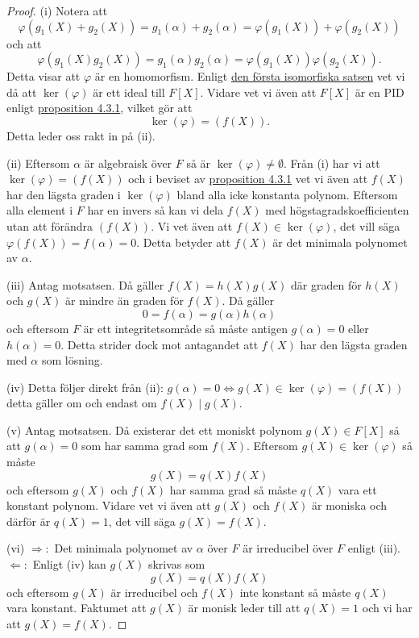 \documentclass{article}
\theoremstyle{definition}
\begin{document}
\begin{proof}
  (i) Notera att 
  \[\varphi(g_1(X) + g_2(X)) = g_1(\alpha) + g_2(\alpha) = \varphi(g_1(X)) + \varphi(g_2(X))\]
  och att 
  \[\varphi(g_1(X) g_2(X)) = g_1(\alpha) g_2(\alpha) = \varphi(g_1(X)) \varphi(g_2(X)).\]
  Detta visar att $\varphi$ är en homomorfism. Enligt \hyperlink{isomorfiska}{den första isomorfiska satsen} vet vi då att $\ker(\varphi)$ är ett ideal 
  till $F[X]$. Vidare vet vi även att $F[X]$ är en PID enligt \hyperlink{pid}{proposition 4.3.1}, vilket gör att 
  \[\ker(\varphi) = (f(X)).\]
  Detta leder oss rakt in på (ii).

  (ii) Eftersom $\alpha$ är algebraisk över $F$ så är $\ker(\varphi) \neq \emptyset$. Från (i) har vi att $\ker(\varphi) = (f(X))$
  och i beviset av \hyperlink{pid}{proposition 4.3.1} vet vi även att $f(X)$ har den lägsta graden i $\ker(\varphi)$ bland alla icke konstanta polynom. 
  Eftersom alla element i $F$ har en invers så kan vi dela $f(X)$ med högstagradskoefficienten utan att förändra $(f(X))$. Vi vet även att 
  $f(X) \in \ker(\varphi)$, det vill säga $\varphi(f(X)) = f(\alpha) = 0$. Detta betyder att $f(X)$ är det minimala polynomet av $\alpha$.

  (iii) Antag motsatsen. Då gäller $f(X) = h(X)g(X)$ där graden för $h(X)$ och $g(X)$ är mindre än graden för $f(X)$. Då gäller 
  \[0 = f(\alpha) = g(\alpha) h(\alpha)\]
  och eftersom $F$ är ett integritetsområde så måste antigen 
  $g(\alpha) = 0$ eller $h(\alpha) = 0$. Detta strider dock mot antagandet att $f(X)$ har den lägsta graden med $\alpha$ som lösning. 

  (iv) Detta följer direkt från (ii): $g(\alpha) = 0 \iff g(X) \in \ker(\varphi) = (f(X))$ detta gäller om och endast om $f(X) \; | \; g(X).$ 
  
  (v) Antag motsatsen. Då existerar det ett moniskt polynom $g(X) \in F[X]$ så att $g(\alpha) = 0$ som har samma grad som $f(X)$. 
  Eftersom $g(X) \in \ker(\varphi)$ så måste 
  \[g(X) = q(X) f(X)\]
  och eftersom $g(X)$ och $f(X)$ har samma grad så måste $q(X)$ vara ett konstant polynom. Vidare vet vi även att $g(X)$ och $f(X)$ är moniska 
  och därför är $q(X) = 1$, det vill säga $g(X) = f(X)$.

  (vi) $\Rightarrow:$ Det minimala polynomet av $\alpha$ över $F$ är irreducibel över $F$ enligt (iii). 
  $\Leftarrow:$ Enligt (iv) kan $g(X)$ skrivas som 
  \[g(X) = q(X)f(X)\]
  och eftersom $g(X)$ är irreducibel och $f(X)$ inte konstant så måste $q(X)$ vara konstant. Faktumet att $g(X)$ är monisk leder till att 
  $q(X) = 1$ och vi har att $g(X) = f(X).$
\end{proof}
\end{document}
